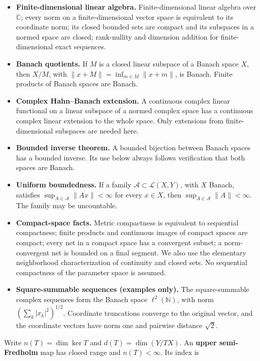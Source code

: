 \documentclass[
  11pt,
]{article}
\providecommand{\tightlist}{%
  \setlength{\itemsep}{0pt}\setlength{\parskip}{0pt}}
\begin{document}
\begin{itemize}
\tightlist
\item
  \textbf{Finite-dimensional linear algebra.} Finite-dimensional linear
  algebra over \(\mathbb C\); every norm on a finite-dimensional vector
  space is equivalent to its coordinate norm; its closed bounded sets
  are compact and its subspaces in a normed space are closed;
  rank-nullity and dimension addition for finite-dimensional exact
  sequences.
\item
  \textbf{Banach quotients.} If \(M\) is a closed linear subspace of a
  Banach space \(X\), then \(X/M\), with
  \(\|x+M\|=\inf_{m\in M}\|x+m\|\), is Banach. Finite products of Banach
  spaces are Banach.
\item
  \textbf{Complex Hahn--Banach extension.} A continuous complex linear
  functional on a linear subspace of a normed complex space has a
  continuous complex linear extension to the whole space. Only
  extensions from finite-dimensional subspaces are needed here.
\item
  \textbf{Bounded inverse theorem.} A bounded bijection between Banach
  spaces has a bounded inverse. Its use below always follows
  verification that both spaces are Banach.
\item
  \textbf{Uniform boundedness.} If a family
  \(\mathcal A\subset\mathcal L(X,Y)\), with \(X\) Banach, satisfies
  \(\sup_{A\in\mathcal A}\|Ax\|<\infty\) for every \(x\in X\), then
  \(\sup_{A\in\mathcal A}\|A\|<\infty\). The family may be uncountable.
\item
  \textbf{Compact-space facts.} Metric compactness is equivalent to
  sequential compactness; finite products and continuous images of
  compact spaces are compact; every net in a compact space has a
  convergent subnet; a norm-convergent net is bounded on a final
  segment. We also use the elementary neighborhood characterization of
  continuity and closed sets. No sequential compactness of the parameter
  space is assumed.
\item
  \textbf{Square-summable sequences (examples only).} The
  square-summable complex sequences form the Banach space
  \(\ell^2(\mathbb N)\), with norm \((\sum_k|x_k|^2)^{1/2}\). Coordinate
  truncations converge to the original vector, and the coordinate
  vectors have norm one and pairwise distance \(\sqrt2\).
\end{itemize}

Write \(n(T)=\dim\ker T\) and \(d(T)=\dim(Y/TX)\). An \textbf{upper
semi-Fredholm} map has closed range and \(n(T)<\infty\). Its index is
\end{document}
